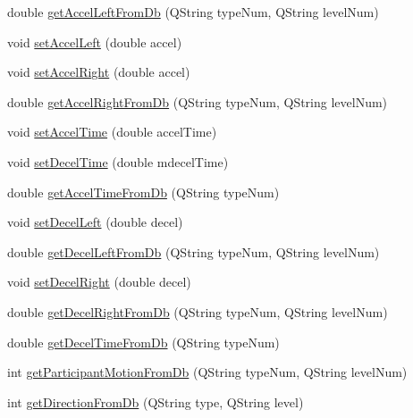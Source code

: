 \begin{DoxyCompactItemize}
\item 
double \hyperlink{class_treadmill_automation_db_i_face_a9d028cc3d56ffa0f9a08bcbb1a7a68b7}{get\+Accel\+Left\+From\+Db} (Q\+String type\+Num, Q\+String level\+Num)
\item 
void \hyperlink{class_treadmill_automation_db_i_face_a14273054d1236eb6a2cd0db13037a4e9}{set\+Accel\+Left} (double accel)
\item 
void \hyperlink{class_treadmill_automation_db_i_face_a8c58d70ef6116fca1ca12357dece5511}{set\+Accel\+Right} (double accel)
\item 
double \hyperlink{class_treadmill_automation_db_i_face_a43f08ef404ec4688139bdcf2980df2d9}{get\+Accel\+Right\+From\+Db} (Q\+String type\+Num, Q\+String level\+Num)
\item 
void \hyperlink{class_treadmill_automation_db_i_face_aa9419917bab8f262b1a058340dbf4570}{set\+Accel\+Time} (double accel\+Time)
\item 
void \hyperlink{class_treadmill_automation_db_i_face_ad9921d5bae1050fdaf300076915733da}{set\+Decel\+Time} (double mdecel\+Time)
\item 
double \hyperlink{class_treadmill_automation_db_i_face_a0872715321e189d3a3fbf1084e3d5274}{get\+Accel\+Time\+From\+Db} (Q\+String type\+Num)
\item 
void \hyperlink{class_treadmill_automation_db_i_face_a8d7f60d12325634c978ea98075feb924}{set\+Decel\+Left} (double decel)
\item 
double \hyperlink{class_treadmill_automation_db_i_face_a14c9cb53a3b95f0142bfbdb68fdfa02e}{get\+Decel\+Left\+From\+Db} (Q\+String type\+Num, Q\+String level\+Num)
\item 
void \hyperlink{class_treadmill_automation_db_i_face_a048ad2ac754cb27e929bf9c8a0c7ab21}{set\+Decel\+Right} (double decel)
\item 
double \hyperlink{class_treadmill_automation_db_i_face_af989096b53ecd094660db2a1b08edae9}{get\+Decel\+Right\+From\+Db} (Q\+String type\+Num, Q\+String level\+Num)
\item 
double \hyperlink{class_treadmill_automation_db_i_face_ab0f40648321f15da9cad739db19dd6fa}{get\+Decel\+Time\+From\+Db} (Q\+String type\+Num)
\item 
int \hyperlink{class_treadmill_automation_db_i_face_a80f861f6d15119a7b6ead07817393f6e}{get\+Participant\+Motion\+From\+Db} (Q\+String type\+Num, Q\+String level\+Num)
\item 
int \hyperlink{class_treadmill_automation_db_i_face_a21cf6860ec06b988509d671c21693342}{get\+Direction\+From\+Db} (Q\+String type, Q\+String level)

\end{DoxyCompactItemize}
